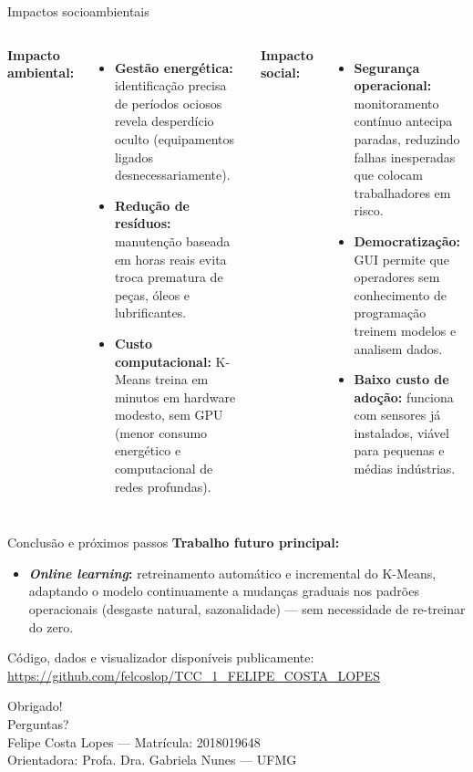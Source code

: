 \documentclass{beamer}
\begin{document}
\begin{frame}{Impactos socioambientais}
    \begin{columns}
        \textbf{Impacto ambiental:}
        \begin{itemize}
            \item \textbf{Gestão energética:} identificação precisa de períodos ociosos revela desperdício oculto (equipamentos ligados desnecessariamente).
            \item \textbf{Redução de resíduos:} manutenção baseada em horas reais evita troca prematura de peças, óleos e lubrificantes.
            \item \textbf{Custo computacional:} K-Means treina em minutos em hardware modesto, sem GPU (menor consumo energético e computacional de redes profundas).
        \end{itemize}
        \textbf{Impacto social:}
        \begin{itemize}
            \item \textbf{Segurança operacional:} monitoramento contínuo antecipa paradas, reduzindo falhas inesperadas que colocam trabalhadores em risco.
            \item \textbf{Democratização:} GUI permite que operadores sem conhecimento de programação treinem modelos e analisem dados.
            \item \textbf{Baixo custo de adoção:} funciona com sensores já instalados, viável para pequenas e médias indústrias.
        \end{itemize}
    \end{columns}
\end{frame}

\begin{frame}{Conclusão e próximos passos}
    \textbf{Trabalho futuro principal:}
    \begin{itemize}
        \item \textbf{\textit{Online learning}:} retreinamento automático e incremental do K-Means, adaptando o modelo continuamente a mudanças graduais nos padrões operacionais (desgaste natural, sazonalidade) --- sem necessidade de re-treinar do zero.
    \end{itemize}
    \vspace{0.2cm}
    \footnotesize
    Código, dados e visualizador disponíveis publicamente:\\
    \url{https://github.com/felcoslop/TCC_1_FELIPE_COSTA_LOPES}
\end{frame}

\begin{frame}
    \begin{center}
        {\Large Obrigado!}\\[0.6cm]
        {\large Perguntas?}\\[1cm]
        \footnotesize
        Felipe Costa Lopes --- Matrícula: 2018019648\\
        Orientadora: Profa. Dra. Gabriela Nunes --- UFMG
    \end{center}
\end{frame}
\end{document}
